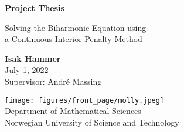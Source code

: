 \documentclass[12pt]{article}
\date{\today}
\begin{document}
\makeatletter

\begin{titlepage}
    \begin{center}
        \vspace*{1cm}

        \Huge
        \textbf{Project Thesis}

        \vspace{0.5cm}
        \Large
        Solving the Biharmonic Equation using \\ a Continuous Interior Penalty Method \\

        \vspace{1.5cm}

        \textbf{Isak Hammer} \\
        July 1, 2022 \\

        \vspace{0.5cm}
        Supervisor: André Massing


        \vfill


        \vspace{0.8cm}

        \texttt{[image: figures/front\_page/molly.jpeg]}\\

        \Large
        Department of Mathematical Sciences\\
        Norwegian University of Science and Technology\\

    \end{center}

\end{titlepage}
\makeatother


    \newpage
    \label{sec:eyyy}


    
    
    
    
    

    \newpage
    \printbibliography
\end{document}
